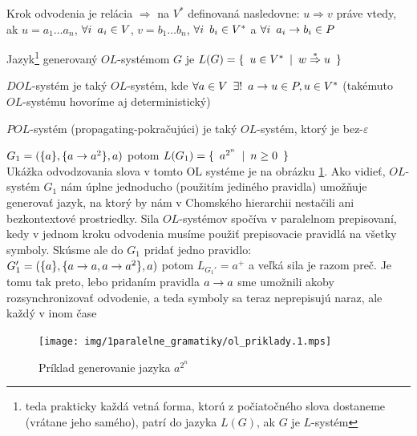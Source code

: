 \begin{definicia}
    Krok odvodenia je relácia $\Rightarrow$ na $V^{*}$ definovaná
    nasledovne: $u\Rightarrow v$ práve vtedy, ak $u=a_{1}\dots a_{n}$,
    $\forall i\enspace a_{i}\in V$, $v=b_{1}\dots b_{n}$, $\forall i\enspace
    b_{i}\in V^{*}$ a $\forall i\enspace a_{i}\rightarrow b_{i}\in P$
\end{definicia}

\begin{definicia}
    Jazyk\footnote{teda prakticky každá vetná forma, ktorú z
    počiatočného slova dostaneme (vrátane jeho samého), patrí do
    jazyka $L(G)$, ak $G$ je $L$-systém} generovaný $OL$-systémom $G$
    je $L(G)=\{\enspace u\in V^{*}\enspace |\enspace w\overset{*}\Rightarrow u\enspace\}$
\end{definicia}

\begin{definicia}
    $DOL$-systém je taký $OL$-systém, kde $\forall a\in V\enspace\exists!
    \enspace a\rightarrow u\in P, u\in V^*$ (takémuto \mbox{$OL$-sys\-té\-mu}
    hovoríme aj deterministický)
\end{definicia}

\begin{definicia}
    $POL$-systém (propagating-pokračujúci) je taký $OL$-systém, ktorý
    je bez-$\varepsilon$
\end{definicia}

\begin{priklad}
    $G_{1}=(\{ a\},\{ a\rightarrow a^{2}\},a)$ potom $L(G_{1})=\{\enspace
    a^{2^{n}}\enspace |\enspace n\geq 0\enspace\}$\\
    Ukážka odvodzovania slova v tomto OL systéme je na obrázku 
    \ref{img:ol_priklad_1}.
    Ako vidieť, $OL$-systém $G_{1}$ nám
    úplne jednoducho (použitím jediného pravidla) umožňuje
    ge\-ne\-ro\-vať jazyk, na ktorý by nám v Chomského hierarchii
    nestačili ani bezkontextové prostriedky. Sila $OL$-systémov
    spočíva v paralelnom prepisovaní, kedy v jednom kroku odvodenia
    musíme použiť prepisovacie pravidlá na všetky symboly. Skúsme ale
    do $G_{1}$ pridať jedno pravidlo:\\ $G_{1}'=(\{ a\},\{ a\rightarrow a,
    a\rightarrow a^{2}\},a)$ potom $L_{G_{1}'}=a^{+}$ a veľká sila je razom
    preč. Je tomu tak preto, lebo pridaním pravidla $a\rightarrow a$ sme
    umožnili akoby rozsynchronizovať odvodenie, a teda symboly sa
    teraz neprepisujú naraz, ale každý v inom čase
\end{priklad}

\begin{figure}[htp]
    \centering
    \texttt{[image: img/1paralelne\_gramatiky/ol\_priklady.1.mps]}
    \caption{Príklad generovanie jazyka $a^{2^n}$}
    \label{img:ol_priklad_1}
\end{figure}

